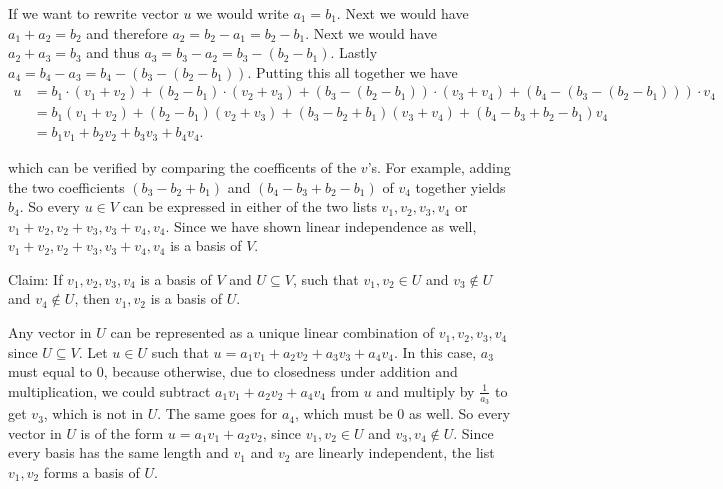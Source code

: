 \begin{xrcs}
\begin{xprf}
    If we want to rewrite vector $u$ we would write $a_1 = b_1.$ Next we would have $a_1 + a_2 = b_2$ and therefore $a_2 = b_2 - a_1 = b_2-b_1$. Next we would have $a_2+a_3=b_3$ and thus $a_3= b_3-a_2 = b_3 - (b_2-b_1)$. Lastly $a_4 = b_4-a_3 = b_4-(b_3 - (b_2-b_1))$. Putting this all together we have
    \[
      \begin{aligned}
        u
        & = b_1 \cdot (v_1+v_2) + (b_2-b_1)\cdot(v_2+v_3) + (b_3 - (b_2-b_1)) \cdot (v_3 + v_4) + (b_4-(b_3 - (b_2-b_1))) \cdot v_4 \\
        & = b_1  (v_1+v_2) + (b_2-b_1)(v_2+v_3) + (b_3 - b_2+b_1)  (v_3 + v_4) + (b_4-b_3+b_2-b_1)  v_4 \\
        & = b_1 v_1 + b_2 v_2 + b_3 v_3 + b_4 v_4.
      \end{aligned}
    \]

    which can be verified by comparing the coefficents of the $v$'s. For example, adding the two coefficients $(b_3 - b_2+b_1)$ and $(b_4-b_3+b_2-b_1)$ of $v_4$ together yields $b_4$. So every $u \in V$ can be expressed in either of the two lists $v_1, v_2, v_3, v_4$ or $v_1 + v_2, v_2 + v_3, v_3+v_4, v_4$. Since we have shown linear independence as well, $v_1 + v_2, v_2 + v_3, v_3+v_4, v_4$ is a basis of $V$.
  \end{xprf}
\end{xrcs}

\begin{xrcs}
  Claim: If $v_1, v_2, v_3, v_4$ is a basis of $V$ and $U \subseteq V$, such that $v_1, v_2 \in U$ and $v_3 \notin U$ and $v_4 \notin U$, then $v_1, v_2$ is a basis of $U$.

  \begin{xprf}
    Any vector in $U$ can be represented as a unique linear combination of $v_1, v_2, v_3, v_4$ since $U \subseteq V$. Let $u\in U$ such that $u=a_1 v_1 + a_2 v_2 + a_3 v_3 + a_4 v_4$. In this case, $a_3$ must equal to $0$, because otherwise, due to closedness under addition and multiplication, we could subtract $a_1 v_1 + a_2 v_2+a_4v_4$ from $u$ and multiply by $\frac{1}{a_3}$ to get $v_3$, which is not in $U$. The same goes for $a_4$, which must be $0$ as well. So every vector in $U$ is of the form $u=a_1 v_1 + a_2 v_2$, since $v_1, v_2 \in U$ and $v_3, v_4 \notin U$. Since every basis has the same length and $v_1$ and $v_2$ are linearly independent, the list $v_1, v_2$ forms a basis of $U$.
  \end{xprf}
\end{xrcs}


